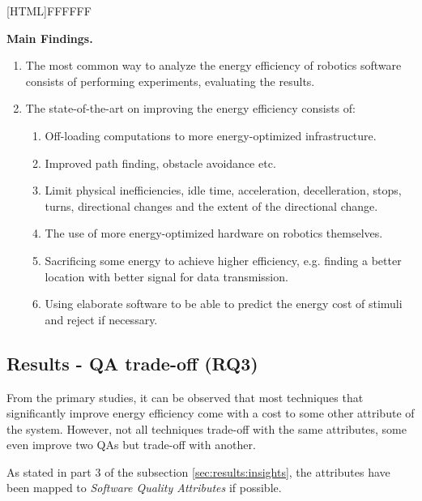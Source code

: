\noindent{}[HTML]{FFFFFF}{\parbox{0.47\textwidth}{%
\noindent \textbf{Main Findings.}
\begin{enumerate}[nolistsep]
\item The most common way to analyze the energy efficiency of robotics software consists of performing experiments, evaluating the results.
\item The state-of-the-art on improving the energy efficiency consists of:
    \begin{enumerate}
        \item Off-loading computations to more energy-optimized infrastructure.
        \item Improved path finding, obstacle avoidance etc.
        \item Limit physical inefficiencies, idle time, acceleration, decelleration, stops, turns, directional changes and the extent of the directional change.
        \item The use of more energy-optimized hardware on robotics themselves.
        \item Sacrificing some energy to achieve higher efficiency, e.g. finding a better location with better signal for data transmission.
        \item Using elaborate software to be able to predict the energy cost of stimuli and reject if necessary.
    \end{enumerate}
\end{enumerate}}}


\subsection{Results - QA trade-off (RQ3)}
\label{sec:results:rq3_trade_off}
From the primary studies, it can be observed that most techniques that significantly improve energy efficiency come with a cost to some other attribute of the system.
However, not all techniques trade-off with the same attributes, some even improve two QAs but trade-off with another.

As stated in part 3 of the subsection \ref{sec:results:insights}, the attributes have been mapped to \textit{Software Quality Attributes\cite{iso2011quality_attributes}}
if possible.

\vspace{2mm}

